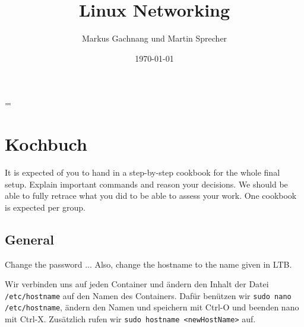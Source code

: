 \documentclass[11pt,titlepage]{article}
\title{Linux Networking}
\author{Markus Gachnang und Martin Sprecher}
\date{\today{}}
\newenvironment{shadedquotation}
 {\begin{shaded*}
  \quoting[leftmargin=0pt, vskip=0pt]
 }
 {\endquoting
 \end{shaded*}
}
\begin{document}
\sffamily
\maketitle
\newpage
\tableofcontents{}
\setcounter{page}{1}
\newpage
\RaggedRight
\emergencystretch=\maxdimen
{}
\let\SectionOriginal\section
\renewcommand\section[1]{\par\medskip\SectionOriginal{#1}}
\let\SubSectionOriginal\subsection
\renewcommand\subsection[1]{\par\medskip\SubSectionOriginal{#1}}

\section{Kochbuch}
\label{sec:Kochbuch}

\begin{shadedquotation}
  It is expected of you to hand in a step-by-step cookbook for the whole final setup. Explain important commands and reason your decisions. We should be able to fully retrace what you did to be able to assess your work. One cookbook is expected per group.
\end{shadedquotation}

\subsection{General}
\label{subsec:General}
\begin{shadedquotation}
  Change the password ... Also, change the hostname to the name given in LTB.
\end{shadedquotation}

Wir verbinden uns auf jeden Container und ändern den Inhalt der Datei \lstinline!/etc/hostname! auf den Namen des Containers.
Dafür benützen wir \lstinline!sudo nano /etc/hostname!, ändern den Namen und speichern mit Ctrl-O und beenden nano mit Ctrl-X.
Zusätzlich rufen wir \lstinline!sudo hostname <newHostName>! auf.
\end{document}
